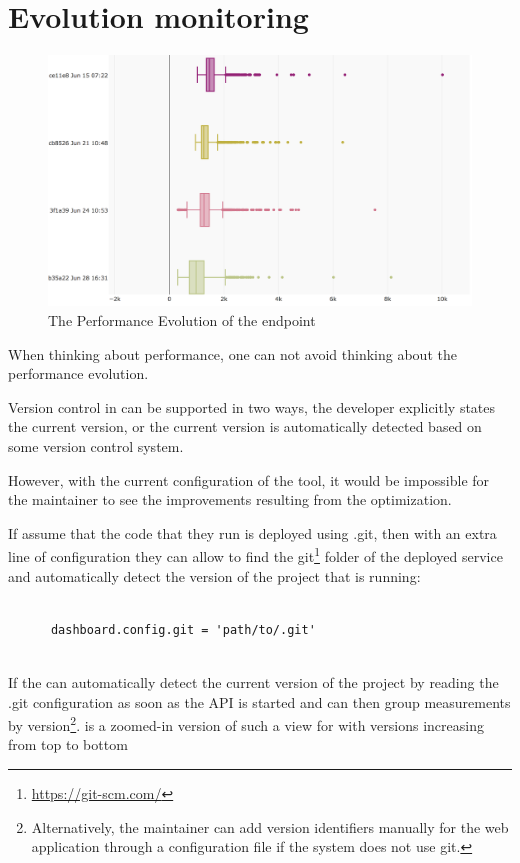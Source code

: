 \documentclass[conference]{IEEEtran}
\begin{document}
  \newpage
  \section{Evolution monitoring }
  
  \begin{figure}[h!]
  \centering
  \includegraphics[width=0.8\linewidth]{translation_endpoint_evolution_}
  \caption{The Performance Evolution of the \epTranslations endpoint}
  \label{fig:tee}
\end{figure}

  When thinking about performance, 
  one can not avoid thinking about the performance evolution. 

  Version control in \tool can be supported in two ways,
  the developer explicitly states the current version, 
  or the current version is automatically detected based
  on some version control system. 


  However, with the current configuration of the tool, it would be impossible for the maintainer to see the improvements resulting from the optimization. 

  If assume that the code that they run is deployed using .git, then with an extra line of configuration they can allow \tool to find the git\footnote{\url{https://git-scm.com/}} folder of the deployed service and automatically detect the version of the project that is running: 
    
    \begin{lstlisting}[style=custompython]
    
      dashboard.config.git = 'path/to/.git'
      
    \end{lstlisting}  
 
  If the \tool can automatically detect the current version of the project by reading the .git configuration as soon as the API is started and can then group measurements by version\footnote{Alternatively, the maintainer can add version identifiers manually for the web application through a configuration file if the system does not use git.}.  is a zoomed-in version of such a view for \epTranslations with versions increasing from top to bottom
  
\end{document}
